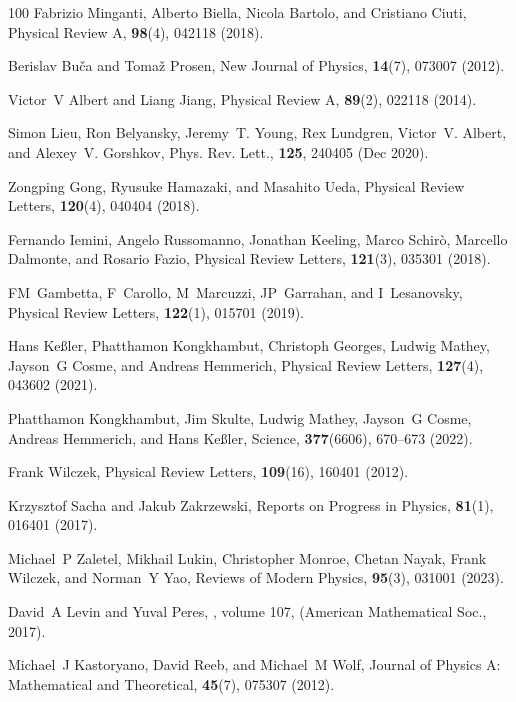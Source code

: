 \documentclass[preprint,pteplogo]{ptephy_v2}%
\numberwithin{equation}{section}
\theoremstyle{definition}
\begin{document}
\begin{thebibliography}{100}
Fabrizio Minganti, Alberto Biella, Nicola Bartolo, and Cristiano Ciuti, Physical Review A, {\bf 98}(4), 042118 (2018).

Berislav Bu{\v{c}}a and Toma{\v{z}} Prosen, New Journal of Physics, {\bf 14}(7), 073007 (2012).

Victor~V Albert and Liang Jiang, Physical Review A, {\bf 89}(2), 022118 (2014).

Simon Lieu, Ron Belyansky, Jeremy~T. Young, Rex Lundgren, Victor~V. Albert, and Alexey~V. Gorshkov, Phys. Rev. Lett., {\bf 125}, 240405 (Dec 2020).

Zongping Gong, Ryusuke Hamazaki, and Masahito Ueda, Physical Review Letters, {\bf 120}(4), 040404 (2018).

Fernando Iemini, Angelo Russomanno, Jonathan Keeling, Marco Schir{\`o}, Marcello Dalmonte, and Rosario Fazio, Physical Review Letters, {\bf 121}(3), 035301 (2018).

FM~Gambetta, F~Carollo, M~Marcuzzi, JP~Garrahan, and I~Lesanovsky, Physical Review Letters, {\bf 122}(1), 015701 (2019).

Hans Ke{\ss}ler, Phatthamon Kongkhambut, Christoph Georges, Ludwig Mathey, Jayson~G Cosme, and Andreas Hemmerich, Physical Review Letters, {\bf 127}(4), 043602 (2021).

Phatthamon Kongkhambut, Jim Skulte, Ludwig Mathey, Jayson~G Cosme, Andreas Hemmerich, and Hans Ke{\ss}ler, Science, {\bf 377}(6606), 670--673 (2022).

Frank Wilczek, Physical Review Letters, {\bf 109}(16), 160401 (2012).

Krzysztof Sacha and Jakub Zakrzewski, Reports on Progress in Physics, {\bf 81}(1), 016401 (2017).

Michael~P Zaletel, Mikhail Lukin, Christopher Monroe, Chetan Nayak, Frank Wilczek, and Norman~Y Yao, Reviews of Modern Physics, {\bf 95}(3), 031001 (2023).

David~A Levin and Yuval Peres,
, volume 107,
\newblock  (American Mathematical Soc., 2017).

Michael~J Kastoryano, David Reeb, and Michael~M Wolf, Journal of Physics A: Mathematical and Theoretical, {\bf 45}(7), 075307 (2012).


\end{thebibliography}
\end{document}
